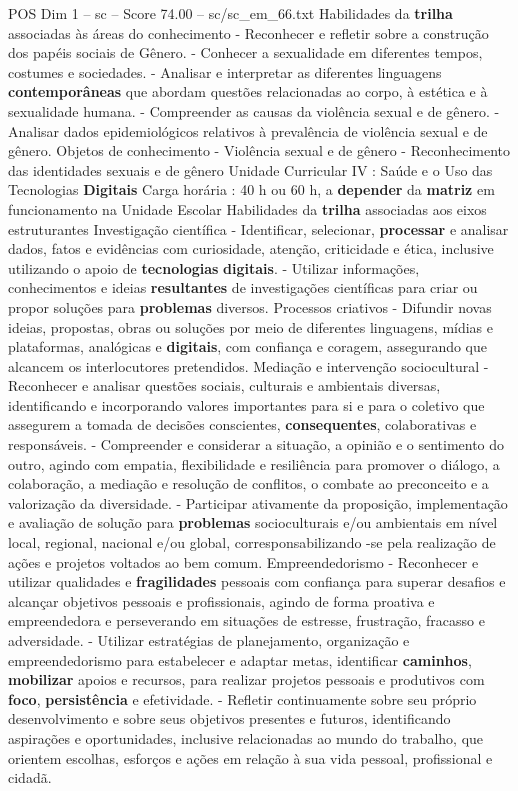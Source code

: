 \begin{textsample}{POS Dim 1 – sc – Score 74.00 – sc/sc\_em\_66.txt}
Habilidades da \textbf{trilha} associadas às áreas do conhecimento - Reconhecer e refletir sobre a construção dos papéis sociais de Gênero. - Conhecer a sexualidade em diferentes tempos, costumes e sociedades. - Analisar e interpretar as diferentes linguagens \textbf{contemporâneas} que abordam questões relacionadas ao corpo, à estética e à sexualidade humana. - Compreender as causas da violência sexual e de gênero. - Analisar dados epidemiológicos relativos à prevalência de violência sexual e de gênero.
Objetos de conhecimento - Violência sexual e de gênero - Reconhecimento das identidades sexuais e de gênero Unidade Curricular IV : Saúde e o Uso das Tecnologias \textbf{Digitais} Carga horária : 40 h ou 60 h, a \textbf{depender} da \textbf{matriz} em funcionamento na Unidade Escolar Habilidades da \textbf{trilha} associadas aos eixos estruturantes Investigação científica - Identificar, selecionar, \textbf{processar} e analisar dados, fatos e evidências com curiosidade, atenção, criticidade e ética, inclusive utilizando o apoio de \textbf{tecnologias} \textbf{digitais}. - Utilizar informações, conhecimentos e ideias \textbf{resultantes} de investigações científicas para criar ou propor soluções para \textbf{problemas} diversos.
Processos criativos - Difundir novas ideias, propostas, obras ou soluções por meio de diferentes linguagens, mídias e plataformas, analógicas e \textbf{digitais}, com confiança e coragem, assegurando que alcancem os interlocutores pretendidos.
Mediação e intervenção sociocultural - Reconhecer e analisar questões sociais, culturais e ambientais diversas, identificando e incorporando valores importantes para si e para o coletivo que assegurem a tomada de decisões conscientes, \textbf{consequentes}, colaborativas e responsáveis. - Compreender e considerar a situação, a opinião e o sentimento do outro, agindo com empatia, flexibilidade e resiliência para promover o diálogo, a colaboração, a mediação e resolução de conflitos, o combate ao preconceito e a valorização da diversidade. - Participar ativamente da proposição, implementação e avaliação de solução para \textbf{problemas} socioculturais e/ou ambientais em nível local, regional, nacional e/ou global, corresponsabilizando -se pela realização de ações e projetos voltados ao bem comum.
Empreendedorismo - Reconhecer e utilizar qualidades e \textbf{fragilidades} pessoais com confiança para superar desafios e alcançar objetivos pessoais e profissionais, agindo de forma proativa e empreendedora e perseverando em situações de estresse, frustração, fracasso e adversidade. - Utilizar estratégias de planejamento, organização e empreendedorismo para estabelecer e adaptar metas, identificar \textbf{caminhos}, \textbf{mobilizar} apoios e recursos, para realizar projetos pessoais e produtivos com \textbf{foco}, \textbf{persistência} e efetividade. - Refletir continuamente sobre seu próprio desenvolvimento e sobre seus objetivos presentes e futuros, identificando aspirações e oportunidades, inclusive relacionadas ao mundo do trabalho, que orientem escolhas, esforços e ações em relação à sua vida pessoal, profissional e cidadã.

\end{textsample}
